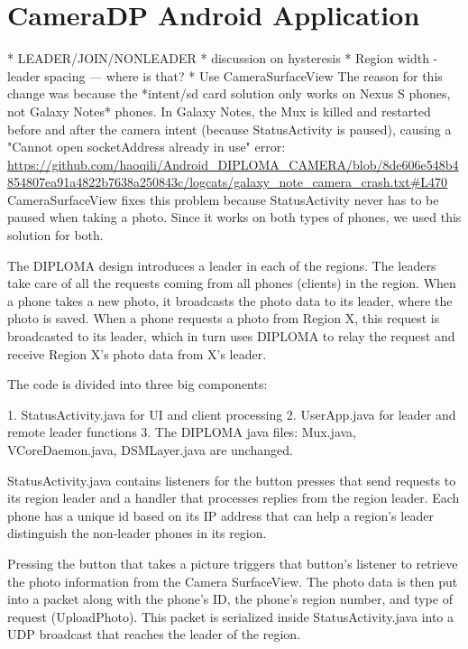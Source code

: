 \chapter{CameraDP Android Application}
* LEADER/JOIN/NONLEADER
* discussion on hysteresis
* Region width - leader spacing --- where is that?
* Use CameraSurfaceView
   The reason for this change was because the *intent/sd card solution only works on Nexus S phones, not Galaxy Notes* phones. In Galaxy Notes, the Mux is killed and restarted before and after the camera intent (because StatusActivity is paused), causing a "Cannot open socketAddress already in use" error: {\url{https://github.com/haoqili/Android_DIPLOMA_CAMERA/blob/8de606e548b4854807ea91a4822b7638a250843c/logcats/galaxy_note_camera_crash.txt#L470}}
    CameraSurfaceView fixes this problem because StatusActivity never has to be paused when taking a photo. Since it works on both types of phones, we used this solution for both.


The DIPLOMA design introduces a leader in each of the regions.  The leaders take care of all the requests coming from all phones (clients) in the region.  When a phone takes a new photo, it broadcasts the photo data to its leader, where the photo is saved. When a phone requests a photo from Region X, this request is broadcasted to its leader, which in turn uses DIPLOMA to relay the request and receive Region X’s photo data from X’s leader.

The code is divided into three big components: 

1.  StatusActivity.java for UI and client processing
2.  UserApp.java for leader and remote leader functions
3.  The DIPLOMA java files: Mux.java, VCoreDaemon.java, DSMLayer.java are unchanged.

StatusActivity.java contains listeners for the button presses that send requests to its region leader and a handler that processes replies from the region leader. Each phone has a unique id based on its IP address that can help a region’s leader distinguish the non-leader phones in its region.  

Pressing the button that takes a picture triggers that button’s listener to retrieve the photo information from the Camera SurfaceView. The photo data is then put into a packet along with the phone’s ID, the phone’s region number, and type of request (UploadPhoto). This packet is serialized inside StatusActivity.java into a UDP broadcast that reaches the leader of the region.

